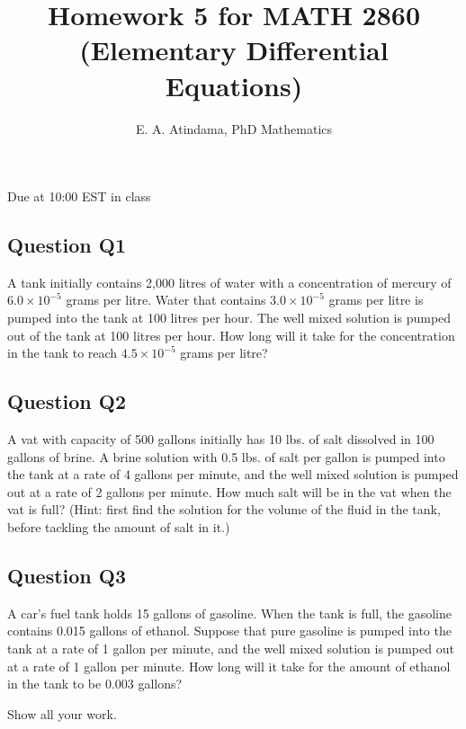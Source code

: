 \documentclass[a4paper,11pt,reqno]{amsart}
\title[MATH 2860 (Elementary Differential Equations)]{Homework 5 for MATH 2860 (Elementary Differential Equations)}
\author[Emmanuel Atindama]{E. A. Atindama, PhD Mathematics}
\numberwithin{equation}{section}
\begin{document}
\maketitle

Due at 10:00 EST in class

\subsection*{Question Q1}
  A tank initially contains 2,000 litres of water with a concentration of mercury of $6.0\times10^{-5}$ grams
  per litre. Water that contains $3.0\times 10^{-5}$ grams per litre is pumped into the tank at 100 litres per
  hour. The well mixed solution is pumped out of the tank at 100 litres per hour. How long will it
  take for the concentration in the tank to reach $4.5\times 10^{-5}$ grams per litre?

  \vspace{1cm}



\subsection*{Question Q2}
  A vat with capacity of 500 gallons initially has 10 lbs. of salt dissolved in 100 gallons of brine. A
  brine solution with 0.5 lbs. of salt per gallon is pumped into the tank at a rate of 4 gallons per
  minute, and the well mixed solution is pumped out at a rate of 2 gallons per minute. How much
  salt will be in the vat when the vat is full? (Hint: first find the solution for the volume of the fluid in the tank, before tackling the amount of salt in it.)
  
  \vspace{1cm}


  
\subsection*{Question Q3}
  A car's fuel tank holds 15 gallons of gasoline. When the tank is full, the gasoline contains 0.015 gallons of ethanol. 
  Suppose that pure gasoline is pumped into the tank at a rate of 1 gallon per minute, and the well mixed solution is 
  pumped out at a rate of 1 gallon per minute. How long will it take for the amount of ethanol in the tank to be 0.003 gallons?

  \textcolor{red!20}{Show all your work.}
\end{document}
